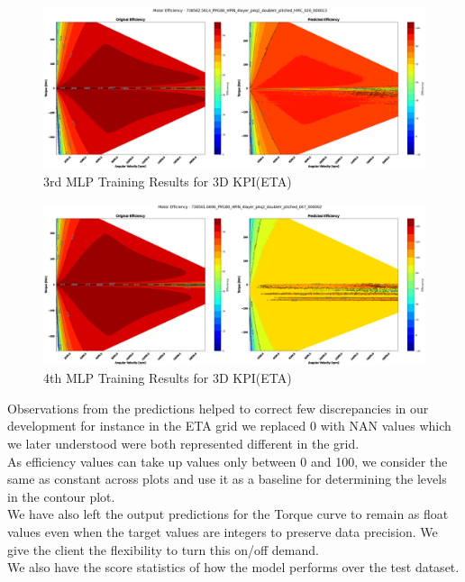 \documentclass{report} %
\begin{document}
\begin{figure}[H]
    \centering
    \includegraphics[width=1\textwidth]{./ReportImages/KPI3Dprediction1.png} 
    \caption{3rd MLP Training Results for 3D KPI(ETA)} 
    \label{fig:3rd MLP Training Results for 3D KPI(ETA)}
\end{figure}

\begin{figure}[H]
    \centering
    \includegraphics[width=1\textwidth]{./ReportImages/KPI3Dprediction2.png} 
    \caption{4th MLP Training Results for 3D KPI(ETA)} 
    \label{fig:4th MLP Training Results for 3D KPI(ETA)}
\end{figure}


Observations from the predictions helped to correct few discrepancies in our development for instance in the ETA grid we replaced 0 with NAN values which we later understood were both represented different in the grid.\\
As efficiency values can take up values only between 0 and 100, we consider the same as constant across plots and use it as a baseline for determining the levels in the contour plot. \\ 
We have also left the output predictions for the Torque curve to remain as float values even when the target values are integers to preserve data precision. We give the client the flexibility to turn this on/off demand. \\
We also have the score statistics of how the model performs over the test dataset.\\
\end{document}
